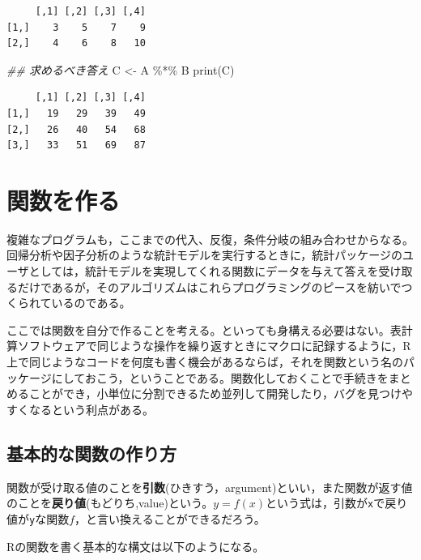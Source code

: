 \documentclass[
  a4paper,
]{ltjsbook}
\newenvironment{Shaded}{\begin{snugshade}}{\end{snugshade}}
\newcommand{\DocumentationTok}[1]{\textcolor[rgb]{0.37,0.37,0.37}{\textit{#1}}}
\newcommand{\FunctionTok}[1]{\textcolor[rgb]{0.28,0.35,0.67}{#1}}
\newcommand{\NormalTok}[1]{\textcolor[rgb]{0.00,0.23,0.31}{#1}}
\newcommand{\OtherTok}[1]{\textcolor[rgb]{0.00,0.23,0.31}{#1}}
\newcommand{\SpecialCharTok}[1]{\textcolor[rgb]{0.37,0.37,0.37}{#1}}
\begin{document}
\begin{verbatim}
     [,1] [,2] [,3] [,4]
[1,]    3    5    7    9
[2,]    4    6    8   10
\end{verbatim}

\begin{Shaded}
\begin{Highlighting}[]
\DocumentationTok{\#\# 求めるべき答え}
\NormalTok{C }\OtherTok{\textless{}{-}}\NormalTok{ A }\SpecialCharTok{\%*\%}\NormalTok{ B}
\FunctionTok{print}\NormalTok{(C)}
\end{Highlighting}
\end{Shaded}

\begin{verbatim}
     [,1] [,2] [,3] [,4]
[1,]   19   29   39   49
[2,]   26   40   54   68
[3,]   33   51   69   87
\end{verbatim}

\section{関数を作る}\label{ux95a2ux6570ux3092ux4f5cux308b}

複雑なプログラムも，ここまでの代入、反復，条件分岐の組み合わせからなる。回帰分析や因子分析のような統計モデルを実行するときに，統計パッケージのユーザとしては，統計モデルを実現してくれる関数にデータを与えて答えを受け取るだけであるが，そのアルゴリズムはこれらプログラミングのピースを紡いでつくられているのである。

ここでは関数を自分で作ることを考える。といっても身構える必要はない。表計算ソフトウェアで同じような操作を繰り返すときにマクロに記録するように，R上で同じようなコードを何度も書く機会があるならば，それを関数という名のパッケージにしておこう，ということである。関数化しておくことで手続きをまとめることができ，小単位に分割できるため並列して開発したり，バグを見つけやすくなるという利点がある。

\subsection{基本的な関数の作り方}\label{ux57faux672cux7684ux306aux95a2ux6570ux306eux4f5cux308aux65b9}

関数が受け取る値のことを\textbf{引数}(ひきすう，argument)といい，また関数が返す値のことを\textbf{戻り値}(もどりち,value)という。\(y=f(x)\)という式は，引数が\texttt{x}で戻り値が\texttt{y}な関数\(f\)，と言い換えることができるだろう。

Rの関数を書く基本的な構文は以下のようになる。
\end{document}
